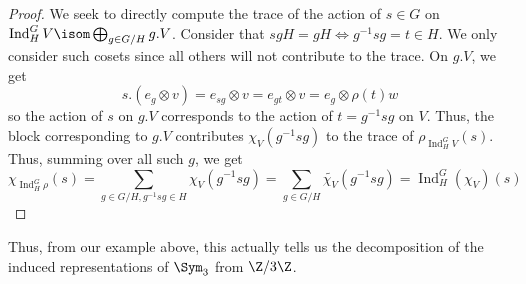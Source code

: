 \documentclass[11pt,leqno,oneside]{amsbook}
\newcommand{\Ind}{\operatorname{Ind}}
\numberwithin{thm}{section}
\begin{document}
\begin{proof}
  We seek to directly compute the trace of the action of \(s \in
  G\) on \(\Ind_H^G V \isom \bigoplus_{g \in G/H} g.V\). Consider that
  \(sgH = gH \iff g^{-1}sg = t \in H\). We only 
  consider such cosets since all others will not contribute to the
  trace.  On \(g.V\), we
  get \[
    s. (e_g \otimes v) = e_{sg}
    \otimes v = e_{gt} \otimes v = e_g \otimes \rho(t)w
  \]
  so the action of \(s\) on \(g.V\) corresponds to the action of \(t =
  g^{-1}sg\) on \(V\). Thus, the block corresponding to \(g.V\)
  contributes \(\chi_V(g^{-1}sg)\) to the trace of \(\rho_{\Ind_H^G
    V}(s)\). Thus, summing over all such \(g\), we get \[
    \chi_{\Ind_H^G \rho}(s) = \sum_{g \in G/H, g^{-1}sg \in H}
      \chi_V(g^{-1}sg) = \sum_{g \in G/H} \tilde{\chi_V}(g^{-1}sg) = \Ind_H^G(\chi_V)(s)
  \]
\end{proof}
\begin{example}
  Thus, from our example above, this actually tells us the
  decomposition of the induced representations of \(\Sym_3\) from \(\Z/3\Z\).
\end{example}
\end{document}
